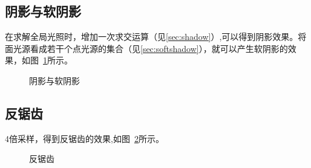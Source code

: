 \documentclass{article}
\begin{document}
\subsection{阴影与软阴影} 
在求解全局光照时，增加一次求交运算（见\ref{sec:shadow}）,可以得到阴影效果。将面光源看成若干个点光源的集合（见\ref{sec:softshadow}），就可以产生软阴影的效果，如图~\ref{fig:shadow}所示。
\begin{figure}[H]
  \centering%
  \caption{阴影与软阴影}
  \label{fig:shadow}
\end{figure}
\subsection{反锯齿}
4倍采样，得到反锯齿的效果,如图~\ref{fig:aa}所示。
\begin{figure}[H]
  \centering%
  \caption{反锯齿}
  \label{fig:aa}
\end{figure}
\end{document}
